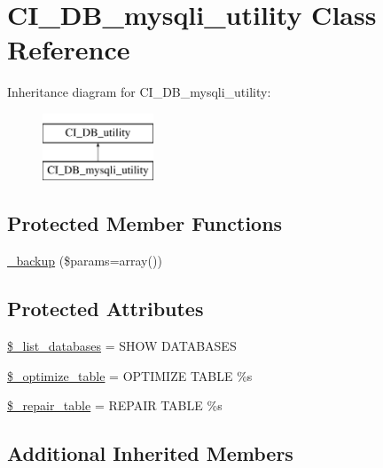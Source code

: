 \hypertarget{class_c_i___d_b__mysqli__utility}{}\section{C\+I\+\_\+\+D\+B\+\_\+mysqli\+\_\+utility Class Reference}
\label{class_c_i___d_b__mysqli__utility}
Inheritance diagram for C\+I\+\_\+\+D\+B\+\_\+mysqli\+\_\+utility\+:\begin{figure}[H]
\begin{center}
\leavevmode
\includegraphics[height=2.000000cm]{class_c_i___d_b__mysqli__utility}
\end{center}
\end{figure}
\subsection*{Protected Member Functions}
\begin{DoxyCompactItemize}
\item 
\hyperlink{class_c_i___d_b__mysqli__utility_a30f3053d2c82e7562349924363507afa}{\+\_\+backup} (\$params=array())
\end{DoxyCompactItemize}
\subsection*{Protected Attributes}
\begin{DoxyCompactItemize}
\item 
\hyperlink{class_c_i___d_b__mysqli__utility_afe3a5b80562d93d6bc7e2b53c95b7e5a}{\$\+\_\+list\+\_\+databases} = \textquotesingle{}S\+H\+O\+W D\+A\+T\+A\+B\+A\+S\+E\+S\textquotesingle{}
\item 
\hyperlink{class_c_i___d_b__mysqli__utility_a083199e5c22c78912dae0a47bb2d7fad}{\$\+\_\+optimize\+\_\+table} = \textquotesingle{}O\+P\+T\+I\+M\+I\+Z\+E T\+A\+B\+L\+E \%s\textquotesingle{}
\item 
\hyperlink{class_c_i___d_b__mysqli__utility_a5cf925cbd52e3f6ba5b7ada3fa436efc}{\$\+\_\+repair\+\_\+table} = \textquotesingle{}R\+E\+P\+A\+I\+R T\+A\+B\+L\+E \%s\textquotesingle{}
\end{DoxyCompactItemize}
\subsection*{Additional Inherited Members}


